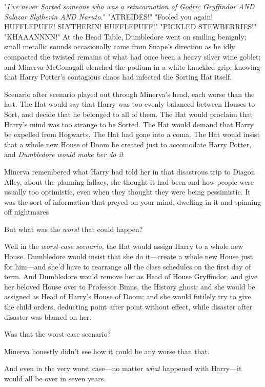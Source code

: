 "\emph{I've never Sorted someone who was a reincarnation of Godric Gryffindor
AND Salazar Slytherin AND Naruto.}"
\sbreak
"ATREIDES!"
\sbreak
"Fooled you again! HUFFLEPUFF! SLYTHERIN! HUFFLEPUFF!"
\sbreak
"PICKLED STEWBERRIES!"
\sbreak
"KHAAANNNN!"
\sbreak
At the Head Table, Dumbledore went on smiling benignly; small metallic sounds
occasionally came from Snape's direction as he idly compacted the twisted
remains of what had once been a heavy silver wine goblet; and Minerva
McGonagall clenched the podium in a white-knuckled grip, knowing that Harry
Potter's contagious chaos had infected the Sorting Hat itself.

Scenario after scenario played out through Minerva's head, each worse than the
last. The Hat would say that Harry was too evenly balanced between Houses to
Sort, and decide that he belonged to all of them. The Hat would proclaim that
Harry's mind was too strange to be Sorted. The Hat would demand that Harry be
expelled from Hogwarts. The Hat had gone into a coma. The Hat would insist that
a whole new House of Doom be created just to accomodate Harry Potter, and
\emph{Dumbledore would make her do it{\el}}

Minerva remembered what Harry had told her in that disastrous trip to Diagon
Alley, about the{\el} planning fallacy, she thought it had been{\el} and
how people were usually too optimistic, even when they thought they were being
pessimistic. It was the sort of information that preyed on your mind, dwelling
in it and spinning off nightmares{\el}

But what was the \emph{worst} that could happen?

Well{\el} in the \emph{worst-case scenario,} the Hat would assign Harry to a
whole new House. Dumbledore would insist that she do it---create a whole new
House just for him---and she'd have to rearrange all the class schedules on the
first day of term. And Dumbledore would remove her as Head of House Gryffindor,
and give her beloved House over to{\el} Professor Binns, the History ghost;
and she would be assigned as Head of Harry's House of Doom; and she would
futilely try to give the child orders, deducting point after point without
effect, while disaster after disaster was blamed on her.

Was that the worst-case scenario?

Minerva honestly didn't see how it could be any worse than that.

And even in the very worst case---no matter \emph{what} happened with
Harry---it would all be over in seven years.

